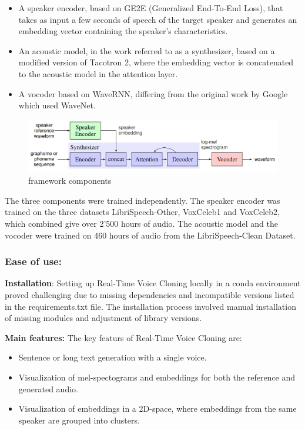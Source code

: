 \begin{itemize}
    \item A speaker encoder, based on GE2E (Generalized End-To-End Loss)\cite{wan2018generalized}, that takes as input a few seconds of speech of the target speaker and generates an embedding vector containing the speaker's characteristics.
    \item An acoustic model, in the work referred to as a synthesizer, based on a modified version of Tacotron 2, where the embedding vector is concatenated to the acoustic model in the attention layer. 
    \item A vocoder based on WaveRNN, differing from the original work by Google\cite{jia2018transfer} which used WaveNet. 
\end{itemize}

\begin{figure}[h!]
    \centering
    \includegraphics[width=1\linewidth]{assets/realtime voice cloning inference.png}
    \caption{framework components\cite{jia2018transfer}}
    \label{fig:rtvc_framework}
\end{figure}

The three components were trained independently. The speaker encoder was trained on the three datasets LibriSpeech-Other, VoxCeleb1 and VoxCeleb2, which combined give over 2'500 hours of audio. The acoustic model and the vocoder were trained on 460 hours of audio from the LibriSpeech-Clean Dataset.

\subsubsection{Ease of use:}

\textbf{Installation}: Setting up Real-Time Voice Cloning locally in a conda environment proved challenging due to missing dependencies and incompatible versions listed in the requirements.txt file. The installation process involved manual installation of missing modules and adjustment of library versions.

\textbf{Main features:}
The key featurs of Real-Time Voice Cloning are:

\begin{itemize}
    \item Sentence or long text generation with a single voice.
    \item Visualization of mel-spectograms and embeddings for both the reference and generated audio.
    \item Visualization of embeddings in a 2D-space, where embeddings from the same speaker are grouped into clusters.
\end{itemize}


